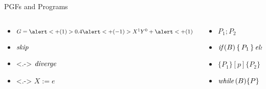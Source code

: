 \begin{frame}{PGFs and Programs}
	
	\begin{columns}
		\begin{column}{0.5\textwidth}
			\begin{itemize}[<+->]
				\itemspacing{10pt}
				\item $ G = \alert<+(1)>{0.4} \alert<+(-1)>{X^1 Y^0}
					+ \alert<+(1)>{0.6} \alert<+(-1)>{X^4 Y^4} $
				\item $\textit{skip}$
				\item<.-> $\textit{diverge}$
				\item<.-> ${X := e}$
			\end{itemize}
		\end{column}
		\begin{column}{0.5\textwidth}
			\begin{itemize}[<.->]
				\itemspacing{10pt}
				\item<+-> ${P_1; P_2}$
				\item $\textit{if}\,(B) \, \{ \, P_1 \, \} \, \textit{else} \, \{ \, P_2 \, \}$
				\item $\{P_1\}[p]\{P_2\}$
				\item $\textit{while}\,(B) \{P\}$
			\end{itemize}
		\end{column}
	\end{columns}
\end{frame}

%
